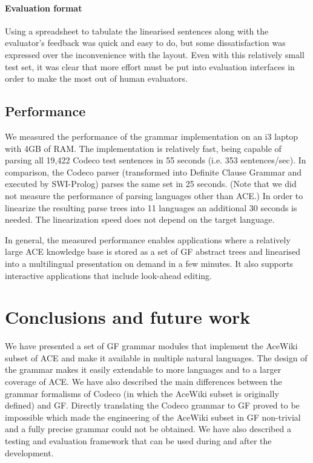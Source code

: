 \documentclass[a4paper]{article}
\begin{document}
\paragraph{Evaluation format}
Using a spreadsheet to tabulate the linearised sentences along with
the evaluator's feedback was quick and easy to do, but some
dissatisfaction was expressed over the inconvenience with the
layout. Even with this relatively small test set, it was clear that
more effort must be put into evaluation interfaces in order to make
the most out of human evaluators.

\subsection{Performance}

We measured the performance of the grammar implementation on an i3 laptop
with 4GB of RAM.
The implementation is relatively fast, being capable of parsing
all 19,422 Codeco test sentences in 55 seconds
(i.e. 353 sentences/sec). In comparison, the Codeco parser (transformed into
Definite Clause Grammar and executed by SWI-Prolog) parses
the same set in 25 seconds.
(Note that we did not measure the performance of parsing languages other than
ACE.)
In order to linearize the
resulting parse trees into 11 languages an additional 30 seconds is needed.
The linearization speed does not depend on the target language.

In general,
the measured performance enables applications where a relatively large ACE
knowledge base is stored as a set of GF abstract trees and linearised into a
multilingual presentation on demand in a few minutes. It also supports
interactive applications that include look-ahead editing.

\section{Conclusions and future work}
\label{section:Conclusions}

We have presented a set of GF grammar modules that implement the AceWiki
subset of ACE and make it available in multiple natural languages. The design
of the grammar makes it easily extendable to more languages and to a larger
coverage of ACE.
We have also described the main differences between the grammar formalisms
of Codeco (in which the AceWiki subset is originally defined) and GF. Directly
translating the Codeco grammar to GF proved to be impossible which made the
engineering of the AceWiki subset in GF non-trivial and a fully
precise grammar could not be obtained.
We have also described a testing and evaluation framework that can be used
during and after the development.
\end{document}

